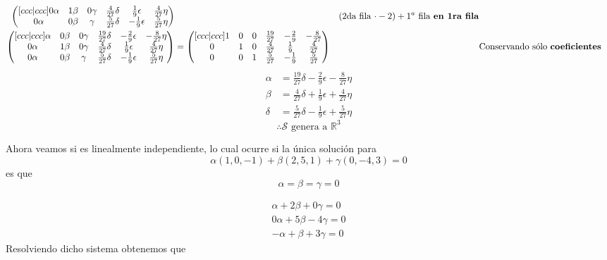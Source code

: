 \documentclass[letterpaper]{article}
\newcommand{\R}{\mathds{R}}
\renewcommand{\*}{\cdot}
\theoremstyle{definition}
\begin{document}
\begin{align*}
\begin{pmatrix}[ccc|ccc]
		 0\alpha & 1\beta & 0\gamma& \frac{4}{27}\delta & \frac{1}{9}\epsilon & \frac{4}{27}\eta\\
		 0\alpha & 0\beta & \gamma & \frac{5}{27}\delta & -\frac{1}{9}\epsilon & \frac{5}{27}\eta
		 \end{pmatrix} && \text{(2da fila $ \* -2) + 1^{a} $ fila \textbf{en 1ra fila}}\\
		 \begin{pmatrix}[ccc|ccc]
		 \alpha & 0\beta & 0\gamma & \frac{19}{27}\delta & -\frac{2}{9}\epsilon & -\frac{8}{27}\eta\\
		 0\alpha & 1\beta & 0\gamma& \frac{4}{27}\delta & \frac{1}{9}\epsilon & \frac{4}{27}\eta\\
		 0\alpha & 0\beta & \gamma & \frac{5}{27}\delta & -\frac{1}{9}\epsilon & \frac{5}{27}\eta
		 \end{pmatrix} & = \begin{pmatrix}[ccc|ccc]
		 1 & 0 & 0 & \frac{19}{27} & -\frac{2}{9} & -\frac{8}{27}\\
		 0 & 1 & 0& \frac{4}{27} & \frac{1}{9} & \frac{4}{27}\\
		 0 & 0 & 1 & \frac{5}{27} & -\frac{1}{9} & \frac{5}{27}
		 \end{pmatrix} && \text{Conservando sólo \textbf{coeficientes}}
	\end{align*}
	\begin{align*}
		\alpha &= \frac{19}{27}\delta -\frac{2}{9}\epsilon -\frac{8}{27}\eta\\
		\beta &= \frac{4}{27}\delta+ \frac{1}{9}\epsilon + \frac{4}{27}\eta\\
		\delta &= \frac{5}{27}\delta -\frac{1}{9}\epsilon+ \frac{5}{27}\eta
	\end{align*}
	\[ \therefore  \mathcal{S} \text{ genera a } \R^3  \]
	
	Ahora veamos si es linealmente independiente, lo cual ocurre si la única solución para \[ \alpha(1,0,-1) + \beta(2,5,1) + \gamma(0,-4,3) = 0  \] es que \[ \alpha = \beta = \gamma = 0 \]
	
		\begin{align*}
		\alpha + 2\beta + 0\gamma =0\\
		0\alpha + 5\beta -4\gamma = 0\\
		-\alpha + \beta +3\gamma = 0
		\end{align*}
	Resolviendo dicho sistema obtenemos que 
	
\end{document}
